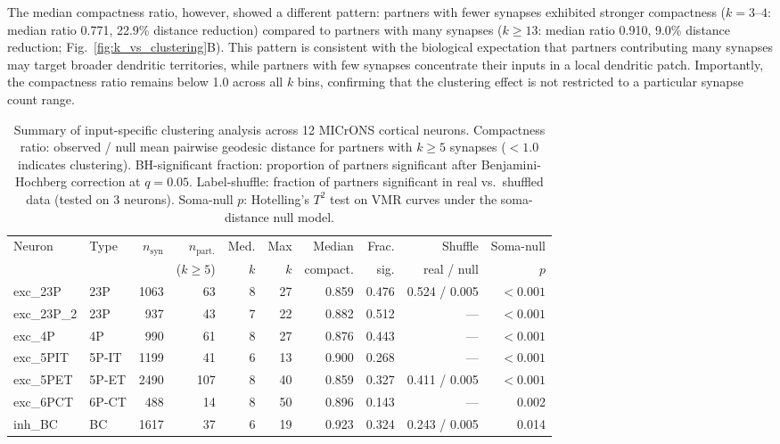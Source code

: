 The median compactness ratio, however, showed a different pattern: partners with fewer synapses exhibited stronger compactness ($k = 3$--$4$: median ratio 0.771, 22.9\% distance reduction) compared to partners with many synapses ($k \geq 13$: median ratio 0.910, 9.0\% distance reduction; Fig.~\ref{fig:k_vs_clustering}B). This pattern is consistent with the biological expectation that partners contributing many synapses may target broader dendritic territories, while partners with few synapses concentrate their inputs in a local dendritic patch. Importantly, the compactness ratio remains below 1.0 across all $k$ bins, confirming that the clustering effect is not restricted to a particular synapse count range.


\begin{table}[t]
\centering
\caption{Summary of input-specific clustering analysis across 12 MICrONS cortical neurons. Compactness ratio: observed / null mean pairwise geodesic distance for partners with $k \geq 5$ synapses ($< 1.0$ indicates clustering). BH-significant fraction: proportion of partners significant after Benjamini-Hochberg correction at $q = 0.05$. Label-shuffle: fraction of partners significant in real vs.\ shuffled data (tested on 3 neurons). Soma-null $p$: Hotelling's $T^2$ test on VMR curves under the soma-distance null model.}
\label{tab:summary}
\small
\begin{tabular}{llrrrrrrrr}
\toprule
Neuron & Type & $n_{\text{syn}}$ & $n_{\text{part.}}$ & Med. & Max & Median & Frac. & Shuffle & Soma-null \\
       &      &                  & ($k \geq 5$)       & $k$  & $k$ & compact. & sig. & real / null & $p$ \\
\midrule
exc\_23P   & 23P   & 1063 & 63  &  8 & 27 & 0.859 & 0.476 & 0.524 / 0.005 & $< 0.001$ \\
exc\_23P\_2 & 23P  &  937 & 43  &  7 & 22 & 0.882 & 0.512 & ---           & $< 0.001$ \\
exc\_4P    & 4P    &  990 & 61  &  8 & 27 & 0.876 & 0.443 & ---           & $< 0.001$ \\
exc\_5PIT  & 5P-IT & 1199 & 41  &  6 & 13 & 0.900 & 0.268 & ---           & $< 0.001$ \\
exc\_5PET  & 5P-ET & 2490 & 107 &  8 & 40 & 0.859 & 0.327 & 0.411 / 0.005 & $< 0.001$ \\
exc\_6PCT  & 6P-CT &  488 & 14  &  8 & 50 & 0.896 & 0.143 & ---           & 0.002 \\
inh\_BC    & BC    & 1617 & 37  &  6 & 19 & 0.923 & 0.324 & 0.243 / 0.005 & 0.014 \\

\end{tabular}
\end{table}
